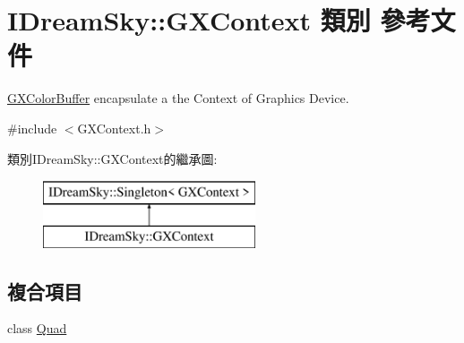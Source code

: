 \hypertarget{class_i_dream_sky_1_1_g_x_context}{}\section{I\+Dream\+Sky\+:\+:G\+X\+Context 類別 參考文件}
\label{class_i_dream_sky_1_1_g_x_context}


\hyperlink{class_i_dream_sky_1_1_g_x_color_buffer}{G\+X\+Color\+Buffer} encapsulate a the Context of Graphics Device.  




{\ttfamily \#include $<$G\+X\+Context.\+h$>$}

類別\+I\+Dream\+Sky\+:\+:G\+X\+Context的繼承圖\+:\begin{figure}[H]
\begin{center}
\leavevmode
\includegraphics[height=2.000000cm]{class_i_dream_sky_1_1_g_x_context}
\end{center}
\end{figure}
\subsection*{複合項目}
\begin{DoxyCompactItemize}
\item 
class \hyperlink{class_i_dream_sky_1_1_g_x_context_1_1_quad}{Quad}
\end{DoxyCompactItemize}

